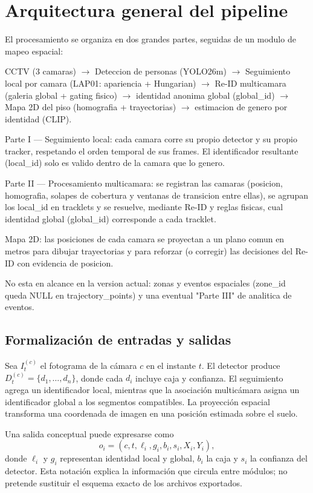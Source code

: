 \documentclass[12pt,letterpaper]{article}
\begin{document}
\section{Arquitectura general del pipeline}

El procesamiento se organiza en dos grandes partes, seguidas de un modulo de mapeo espacial:


CCTV (3 camaras)  $\rightarrow$  Deteccion de personas (YOLO26m)  $\rightarrow$  Seguimiento local por camara (LAP01: apariencia + Hungarian)  $\rightarrow$  Re-ID multicamara (galeria global + gating fisico)  $\rightarrow$  identidad anonima global (global\_\allowbreak id)  $\rightarrow$  Mapa 2D del piso (homografia + trayectorias)  $\rightarrow$  estimacion de genero por identidad (CLIP).


Parte I — Seguimiento local: cada camara corre su propio detector y su propio tracker, respetando el orden temporal de sus frames. El identificador resultante (local\_\allowbreak id) solo es valido dentro de la camara que lo genero.


Parte II — Procesamiento multicamara: se registran las camaras (posicion, homografia, solapes de cobertura y ventanas de transicion entre ellas), se agrupan los local\_\allowbreak id en tracklets y se resuelve, mediante Re-ID y reglas fisicas, cual identidad global (global\_\allowbreak id) corresponde a cada tracklet.


Mapa 2D: las posiciones de cada camara se proyectan a un plano comun en metros para dibujar trayectorias y para reforzar (o corregir) las decisiones del Re-ID con evidencia de posicion.


No esta en alcance en la version actual: zonas y eventos espaciales (zone\_\allowbreak id queda NULL en trajectory\_\allowbreak points) y una eventual "Parte III" de analitica de eventos.


\subsection{Formalización de entradas y salidas}
Sea $I_t^{(c)}$ el fotograma de la cámara $c$ en el instante $t$. El detector produce $D_t^{(c)}=\{d_1,\ldots,d_n\}$, donde cada $d_i$ incluye caja y confianza. El seguimiento agrega un identificador local, mientras que la asociación multicámara asigna un identificador global a los segmentos compatibles. La proyección espacial transforma una coordenada de imagen en una posición estimada sobre el suelo.

Una salida conceptual puede expresarse como
\begin{equation}
 o_i=(c,t,\ell_i,g_i,b_i,s_i,X_i,Y_i),
\end{equation}
donde $\ell_i$ y $g_i$ representan identidad local y global, $b_i$ la caja y $s_i$ la confianza del detector. Esta notación explica la información que circula entre módulos; no pretende sustituir el esquema exacto de los archivos exportados.
\end{document}
